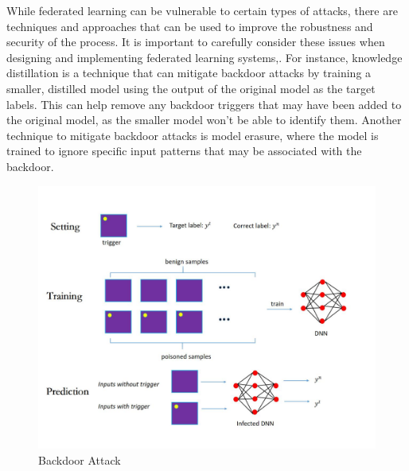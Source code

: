 \documentclass[conference]{IEEEtran}
\begin{document}
While federated learning can be vulnerable to certain types of attacks, there are techniques and approaches that can be used to improve the robustness and security of the process. 
It is important to carefully consider these issues when designing and implementing federated learning systems\cite{b38},\cite{b39}. 
For instance, knowledge distillation is a technique that can mitigate backdoor attacks by training a smaller\cite{b36}, 
distilled model using the output of the original model as the target labels. 
This can help remove any backdoor triggers that may have been added to the original model, as the smaller model won't be able to identify them. 
Another technique to mitigate backdoor attacks is model erasure\cite{b44}, where the model is trained to ignore specific input patterns that may be associated with the backdoor.  
\begin{figure}[htbp]
    \centerline{\includegraphics[width=0.8\linewidth,height=0.4\linewidth]{picture/f3.jpg}}
    \caption{Backdoor Attack}
    \label{fig3}
\end{figure}
\end{document}
